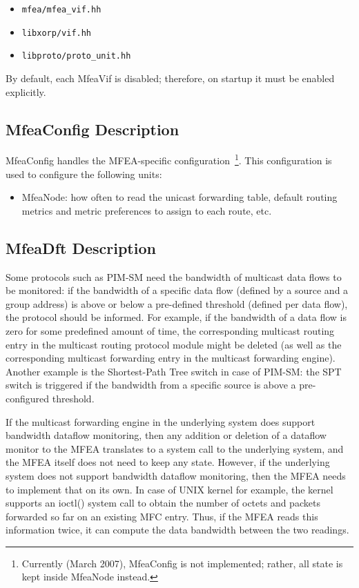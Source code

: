 \documentclass[11pt]{article}
\begin{document}
\begin{itemize}
  \item \verb=mfea/mfea_vif.hh=
  \item \verb=libxorp/vif.hh=
  \item \verb=libproto/proto_unit.hh=
\end{itemize}

By default, each MfeaVif is disabled; therefore, on startup it must be
enabled explicitly.

\subsection{MfeaConfig Description}

MfeaConfig handles the MFEA-specific configuration~\footnote{Currently
(March 2007), MfeaConfig is not implemented; rather, all state is
kept inside MfeaNode instead.}. This configuration is used to configure the
following units:

\begin{itemize}

  \item MfeaNode: how often to read the unicast forwarding table,
  default routing metrics and metric preferences to assign to each
  route, etc.

\end{itemize}

\subsection{MfeaDft Description}

Some protocols such as PIM-SM need the bandwidth of multicast data flows
to be monitored: if the bandwidth of a specific data flow (defined by
a source and a group address) is above or below a pre-defined threshold
(defined per data flow), the protocol should be informed. For example, if the
bandwidth of a data flow is zero for some predefined amount of time, the
corresponding multicast routing entry in the multicast routing protocol
module might be deleted (as well as the corresponding multicast
forwarding entry in the multicast forwarding engine). Another example is
the Shortest-Path Tree switch in case of PIM-SM: the SPT switch is
triggered if the bandwidth from a specific source is above a
pre-configured threshold.

If the multicast forwarding engine in the underlying system does
support bandwidth dataflow monitoring, then any addition or
deletion of a dataflow monitor to the MFEA translates to a system call
to the underlying system, and the MFEA itself does not need to keep any
state. However, if the underlying system does not support bandwidth
dataflow monitoring, then the MFEA needs to implement that on its own.
In case of UNIX kernel for example, the kernel supports an ioctl()
system call to obtain the number of octets and packets forwarded so far on
an existing MFC entry. Thus, if the MFEA reads this information twice,
it can compute the data bandwidth between the two readings.
\end{document}
